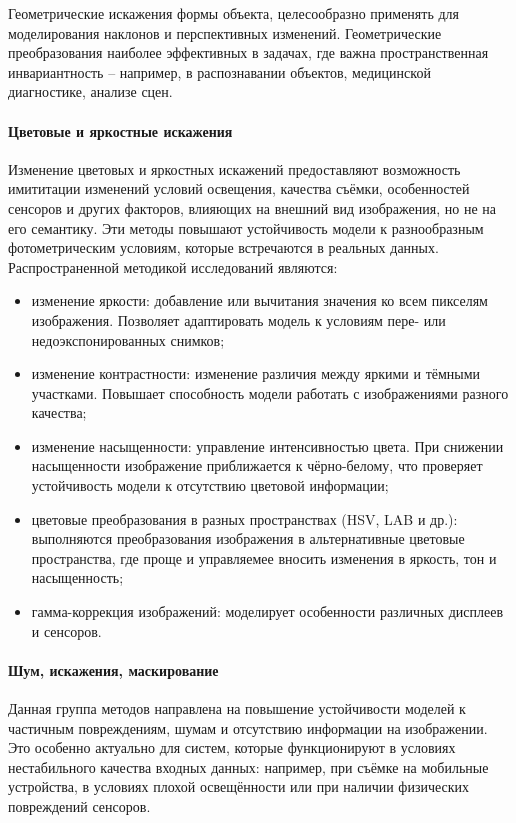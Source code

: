 Геометрические искажения формы объекта, целесообразно применять для моделирования наклонов и перспективных изменений. Геометрические преобразования наиболее эффективных в задачах, где важна пространственная инвариантность – например, в распознавании объектов, медицинской диагностике, анализе сцен.

\paragraph{Цветовые и яркостные искажения}

Изменение цветовых и яркостных искажений предоставляют возможность имититации изменений условий освещения, качества съёмки, особенностей сенсоров и других факторов, влияющих на внешний вид изображения, но не на его семантику. Эти методы повышают устойчивость модели к разнообразным фотометрическим условиям, которые встречаются в реальных данных. Распространенной методикой исследований являются:

\begin{itemize}
	\item изменение яркости: добавление или вычитания значения ко всем пикселям изображения. Позволяет адаптировать модель к условиям пере- или недоэкспонированных снимков;
	\item изменение контрастности: изменение различия между яркими и тёмными участками. Повышает способность модели работать с изображениями разного качества;
	\item изменение насыщенности: управление интенсивностью цвета. При снижении насыщенности изображение приближается к чёрно-белому, что проверяет устойчивость модели к отсутствию цветовой информации;
	\item цветовые преобразования в разных пространствах (HSV, LAB и др.): выполняются преобразования изображения в альтернативные цветовые пространства, где проще и управляемее вносить изменения в яркость, тон и насыщенность;
	\item гамма-коррекция изображений: моделирует особенности различных дисплеев и сенсоров.
\end{itemize}

\paragraph{Шум, искажения, маскирование}

Данная группа методов направлена на повышение устойчивости моделей к частичным повреждениям, шумам и отсутствию информации на изображении. Это особенно актуально для систем, которые функционируют в условиях нестабильного качества входных данных: например, при съёмке на мобильные устройства, в условиях плохой освещённости или при наличии физических повреждений сенсоров.

